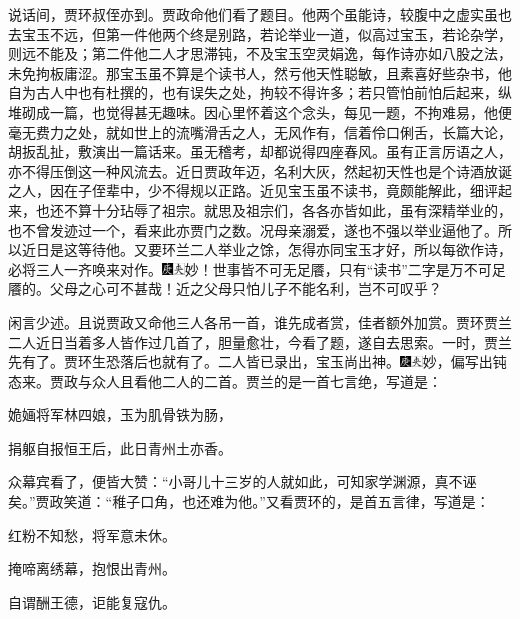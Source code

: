 说话间，贾环叔侄亦到。贾政命他们看了题目。他两个虽能诗，较腹中之虚实虽也去宝玉不远，但第一件他两个终是别路，若论举业一道，似高过宝玉，若论杂学，则远不能及；第二件他二人才思滞钝，不及宝玉空灵娟逸，每作诗亦如八股之法，未免拘板庸涩。那宝玉虽不算是个读书人，然亏他天性聪敏，且素喜好些杂书，他自为古人中也有杜撰的，也有误失之处，拘较不得许多；若只管怕前怕后起来，纵堆砌成一篇，也觉得甚无趣味。因心里怀着这个念头，每见一题，不拘难易，他便毫无费力之处，就如世上的流嘴滑舌之人，无风作有，信着伶口俐舌，长篇大论，胡扳乱扯，敷演出一篇话来。虽无稽考，却都说得四座春风。虽有正言厉语之人，亦不得压倒这一种风流去。近日贾政年迈，名利大灰，然起初天性也是个诗酒放诞之人，因在子侄辈中，少不得规以正路。近见宝玉虽不读书，竟颇能解此，细评起来，也还不算十分玷辱了祖宗。就思及祖宗们，各各亦皆如此，虽有深精举业的，也不曾发迹过一个，看来此亦贾门之数。况母亲溺爱，遂也不强以举业逼他了。所以近日是这等待他。又要环兰二人举业之馀，怎得亦同宝玉才好，所以每欲作诗，必将三人一齐唤来对作。{\includegraphics[width=3mm]{../Images/00004}\includegraphics[width=3mm]{../Images/00012}\footnotesize \kaishu 妙！世事皆不可无足餍，只有“读书”二字是万不可足餍的。父母之心可不甚哉！近之父母只怕儿子不能名利，岂不可叹乎？}

闲言少述。且说贾政又命他三人各吊一首，谁先成者赏，佳者额外加赏。贾环贾兰二人近日当着多人皆作过几首了，胆量愈壮，今看了题，遂自去思索。一时，贾兰先有了。贾环生恐落后也就有了。二人皆已录出，宝玉尚出神。{\includegraphics[width=3mm]{../Images/00004}\includegraphics[width=3mm]{../Images/00012}\footnotesize \kaishu 妙，偏写出钝态来。}贾政与众人且看他二人的二首。贾兰的是一首七言绝，写道是：

姽婳将军林四娘，玉为肌骨铁为肠，

捐躯自报恒王后，此日青州土亦香。

众幕宾看了，便皆大赞：“小哥儿十三岁的人就如此，可知家学渊源，真不诬矣。”贾政笑道：“稚子口角，也还难为他。”又看贾环的，是首五言律，写道是：

红粉不知愁，将军意未休。

掩啼离绣幕，抱恨出青州。

自谓酬王德，讵能复寇仇。

